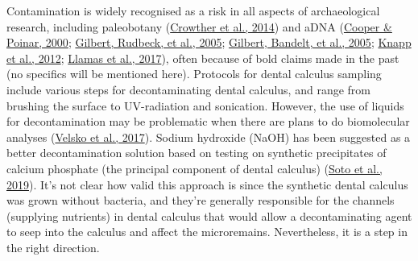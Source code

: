 \documentclass[
  b5paper,
]{book}
\begin{document}
Contamination is widely recognised as a risk in all aspects of
archaeological research, including paleobotany
(\protect\hyperlink{ref-crowtherDocumentingContamination2014}{Crowther
et al., 2014}) and aDNA
(\protect\hyperlink{ref-cooperAncientDNA2000}{Cooper \& Poinar, 2000};
\protect\hyperlink{ref-gilbertBiochemicalPhysical2005}{Gilbert, Rudbeck,
et al., 2005};
\protect\hyperlink{ref-gilbertAssessingAncient2005}{Gilbert, Bandelt, et
al., 2005}; \protect\hyperlink{ref-knappSettingStage2012}{Knapp et al.,
2012}; \protect\hyperlink{ref-llamasFieldLaboratory2017}{Llamas et al.,
2017}), often because of bold claims made in the past (no specifics will
be mentioned here). Protocols for dental calculus sampling include
various steps for decontaminating dental calculus, and range from
brushing the surface to UV-radiation and sonication. However, the use of
liquids for decontamination may be problematic when there are plans to
do biomolecular analyses
(\protect\hyperlink{ref-velskoDentalCalculus2017}{Velsko et al., 2017}).
Sodium hydroxide (NaOH) has been suggested as a better decontamination
solution based on testing on synthetic precipitates of calcium phosphate
(the principal component of dental calculus)
(\protect\hyperlink{ref-sotoCharacterizationDecontamination2019}{Soto et
al., 2019}). It's not clear how valid this approach is since the
synthetic dental calculus was grown without bacteria, and they're
generally responsible for the channels (supplying nutrients) in dental
calculus that would allow a decontaminating agent to seep into the
calculus and affect the microremains. Nevertheless, it is a step in the
right direction.
\end{document}
